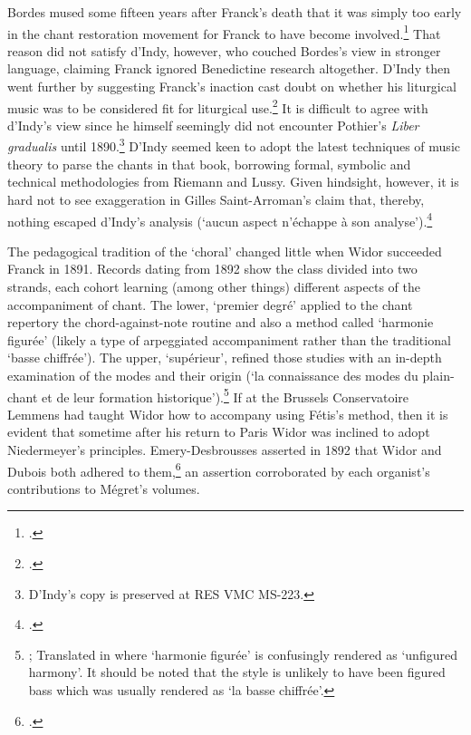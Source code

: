 Bordes mused some fifteen years after Franck's death that it was simply too early in the chant restoration movement for Franck to have become involved.\footcite[578]{Bordessentimentreligieuxdans1904}
That reason did not satisfy d'Indy, however, who couched Bordes's view in stronger language, claiming Franck ignored Benedictine research altogether.
D'Indy then went further by suggesting Franck's inaction cast doubt on whether his liturgical music was to be considered fit for liturgical use.\footcite[p.~107 with citations from Bordes spanning pp.~108 and 109]{DIndyCesarFranck1907}
It is difficult to agree with d'Indy's view since he himself seemingly did not encounter Pothier's \emph{Liber gradualis} until 1890.\footnote{D'Indy's copy is preserved at \covid{}\bnf{} RES VMC MS-223.}
D'Indy seemed keen to adopt the latest techniques of music theory to parse the chants in that book, borrowing formal, symbolic and technical methodologies from Riemann and Lussy.
Given hindsight, however, it is hard not to see exaggeration in Gilles Saint-Arroman's claim that, thereby, nothing escaped d'Indy's analysis (`aucun aspect n'échappe à son analyse').\footcite[82, 86]{Saint-Arromaninfluencelivressolesmiens2019}

The pedagogical tradition of the `choral' changed little when Widor succeeded Franck in 1891.
Records dating from 1892 show the class divided into two strands, each cohort learning (among other things) different aspects of the accompaniment of chant.
The lower, `premier degré' applied to the chant repertory the chord-against-note routine and also a method called `harmonie figurée' (likely a type of arpeggiated accompaniment rather than the traditional `basse chiffrée').
The upper, `supérieur', refined those studies with an in-depth examination of the modes and their origin (`la connaissance des modes du plain-chant et de leur formation historique').\footnote{\cite[375]{PierreConservatoirenationalmusique1900}; Translated in \cite[101]{SmithLouisVierneOrganist2009} where `harmonie figurée' is confusingly rendered as `unfigured harmony'. It should be noted that the style is unlikely to have been figured bass which was usually rendered as `la basse chiffrée'.}
If at the Brussels Conservatoire Lemmens had taught Widor how to accompany using Fétis's method, then it is evident that sometime after his return to Paris Widor was inclined to adopt Niedermeyer's principles.
%
Emery-Desbrousses asserted in 1892 that Widor and Dubois both adhered to them,\footcite[160]{EymieuEtudesbiographiesmusicales1892} an assertion corroborated by each organist's contributions to Mégret's volumes.

